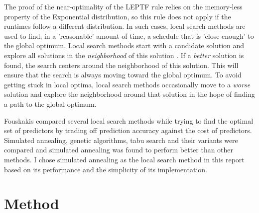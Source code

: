 \documentclass[12pt]{report}
\begin{document}
The proof of the near-optimality of the LEPTF rule relies on the memory-less property of the Exponential distribution, so this rule does not apply if the runtimes follow a different distribution.
In such cases, local search methods are used to find, in a 'reasonable' amount of time, a schedule that is 'close enough' to the global optimum.
Local search methods start with a candidate solution and explore all solutions in the \textit{neighborhood} of this solution \cite{Glass1994}.
If a \textit{better} solution is found, the search centers around the neighborhood of this solution.
This will ensure that the search is always moving toward the global optimum.
To avoid getting stuck in local optima, local search methods occasionally move to a \textit{worse} solution and explore the neighborhood around that solution in the hope of finding a path to the global optimum.

Fouskakis \cite{Fouskakis2001} compared several local search methods while trying to find the optimal set of predictors by trading off prediction accuracy against the cost of predictors. 
Simulated annealing, genetic algorithms, tabu search and their variants were compared and simulated annealing was found to perform better than other methods.
I chose simulated annealing as the local search method in this report based on its performance and the simplicity of its implementation.

\section{Method}
\end{document}
